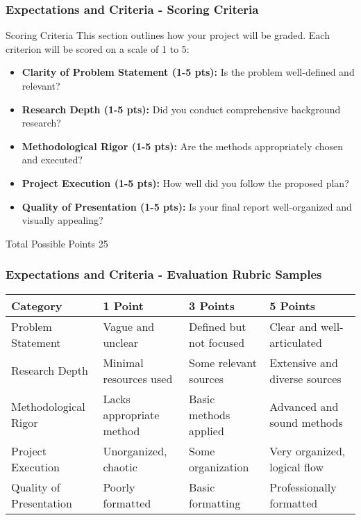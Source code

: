 \documentclass[aspectratio=169]{beamer}
\begin{document}
\begin{frame}[fragile]
    \frametitle{Expectations and Criteria - Scoring Criteria}
    \begin{block}{Scoring Criteria}
        This section outlines how your project will be graded. Each criterion will be scored on a scale of 1 to 5:
    \end{block}
    
    \begin{itemize}
        \item \textbf{Clarity of Problem Statement (1-5 pts):} Is the problem well-defined and relevant?
        \item \textbf{Research Depth (1-5 pts):} Did you conduct comprehensive background research?
        \item \textbf{Methodological Rigor (1-5 pts):} Are the methods appropriately chosen and executed?
        \item \textbf{Project Execution (1-5 pts):} How well did you follow the proposed plan?
        \item \textbf{Quality of Presentation (1-5 pts):} Is your final report well-organized and visually appealing?
    \end{itemize}
    
    \begin{block}{Total Possible Points}
        25
    \end{block}
\end{frame}

\begin{frame}[fragile]
    \frametitle{Expectations and Criteria - Evaluation Rubric Samples}
    \begin{table}[htbp]
        \centering
        \begin{tabular}{|l|l|l|l|}
            \hline
            \textbf{Category} & \textbf{1 Point} & \textbf{3 Points} & \textbf{5 Points} \\ \hline
            Problem Statement & Vague and unclear & Defined but not focused & Clear and well-articulated \\ \hline
            Research Depth & Minimal resources used & Some relevant sources & Extensive and diverse sources \\ \hline
            Methodological Rigor & Lacks appropriate method & Basic methods applied & Advanced and sound methods \\ \hline
            Project Execution & Unorganized, chaotic & Some organization & Very organized, logical flow \\ \hline
            Quality of Presentation & Poorly formatted & Basic formatting & Professionally formatted \\ \hline
        \end{tabular}
    \end{table}
\end{frame}
\end{document}
